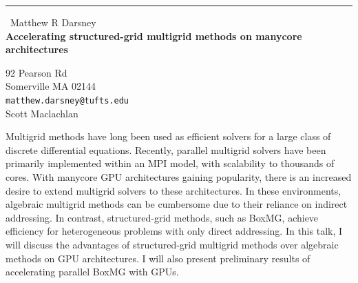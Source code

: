 \documentclass{report}
\begin{document}
\begin{center}
\rule{6in}{1pt} \
{\large Matthew R Darsney \\
{\bf Accelerating structured-grid multigrid methods on manycore architectures}}

92 Pearson Rd \\ Somerville MA 02144
\\
{\tt matthew.darsney@tufts.edu}\\
Scott Maclachlan\end{center}

Multigrid methods have long been used as efficient solvers for a large
class of discrete differential equations. Recently, parallel multigrid
solvers have been primarily implemented within an MPI model, with
scalability to thousands of cores. With manycore GPU architectures
gaining popularity, there is an increased desire to extend multigrid
solvers to these architectures. In these environments, algebraic
multigrid methods can be cumbersome due to their reliance on indirect
addressing. In contrast, structured-grid methods, such as BoxMG, achieve
efficiency for heterogeneous problems with only direct addressing. In
this talk, I will discuss the advantages of structured-grid multigrid
methods over algebraic methods on GPU architectures. I will also present
preliminary results of accelerating parallel BoxMG with GPUs.
\end{document}
